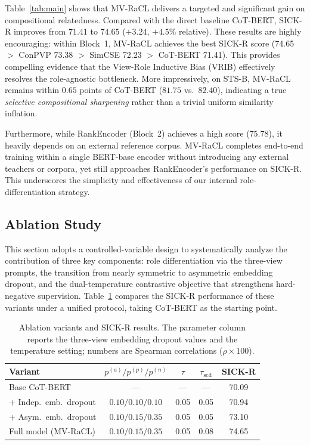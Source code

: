\documentclass[lettersize,journal]{IEEEtran}
\begin{document}
Table~\ref{tab:main} shows that MV-RaCL delivers a targeted and significant gain on compositional relatedness. Compared with the direct baseline CoT-BERT, SICK-R improves from $71.41$ to $74.65$ ($+3.24$, $+4.5\%$ relative). These results are highly encouraging: within Block~1, MV-RaCL achieves the best SICK-R score (74.65 $>$ ConPVP 73.38 $>$ SimCSE 72.23 $>$ CoT-BERT 71.41). This provides compelling evidence that the View-Role Inductive Bias (VRIB) effectively resolves the role-agnostic bottleneck. More impressively, on STS-B, MV-RaCL remains within $0.65$ points of CoT-BERT ($81.75$ vs.\ $82.40$), indicating a true \emph{selective compositional sharpening} rather than a trivial uniform similarity inflation.

Furthermore, while RankEncoder (Block~2) achieves a high score ($75.78$), it heavily depends on an external reference corpus. MV-RaCL completes end-to-end training within a single BERT-base encoder without introducing any external teachers or corpora, yet still approaches RankEncoder's performance on SICK-R. This underscores the simplicity and effectiveness of our internal role-differentiation strategy.

\subsection{Ablation Study}
\label{subsec:ablation}

This section adopts a controlled-variable design to systematically analyze the contribution of three key components: role differentiation via the three-view prompts, the transition from nearly symmetric to asymmetric embedding dropout, and the dual-temperature contrastive objective that strengthens hard-negative supervision. Table~\ref{tab:ablation} compares the SICK-R performance of these variants under a unified protocol, taking CoT-BERT as the starting point.

\begin{table}[!htbp]
\centering
\caption{Ablation variants and SICK-R results. The parameter column reports the three-view embedding dropout values and the temperature setting; numbers are Spearman correlations ($\rho \times 100$).}
\label{tab:ablation}
\small
\setlength{\tabcolsep}{4pt}
\begin{tabular*}{\linewidth}{@{\extracolsep{\fill}}lcccc@{}}
\toprule
Variant & $p^{(a)}/p^{(p)}/p^{(n)}$ & $\tau$ & $\tau_{\mathrm{scd}}$ & SICK-R \\
\midrule
Base CoT-BERT                & ---              & ---  & ---  & 70.09 \\
+ Indep.\ emb.\ dropout      & $0.10/0.10/0.10$ & 0.05 & 0.05 & 70.94 \\
+ Asym.\ emb.\ dropout       & $0.10/0.15/0.35$ & 0.05 & 0.05 & 73.10 \\
Full model (MV-RaCL)         & $0.10/0.15/0.35$ & 0.05 & 0.08 & 74.65 \\
\bottomrule
\end{tabular*}
\end{table}
\end{document}
